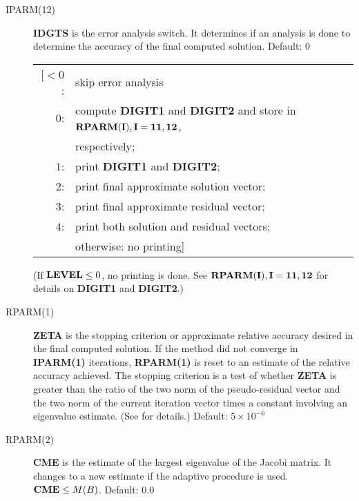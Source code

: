 \begin{description}
 \item[IPARM(12)] {\bf IDGTS} is the error analysis switch.  It determines
                  if an analysis is done to determine the accuracy of 
                  the final computed solution.  Default: $0$
 
                  \begin{tabular}{rl} 
                  [$<0$: & skip error analysis \\
                   $0$:  & compute {\bf DIGIT1} and {\bf DIGIT2} and 
                           store in ${\bf RPARM(I), I=11,12}$, \\ 
                         & respectively; \\
                   $1$:  & print {\bf DIGIT1} and {\bf DIGIT2}; \\
                   $2$:  & print final approximate solution vector; \\
                   $3$:  & print final approximate residual vector; \\
                   $4$:  & print both solution and residual vectors; \\
                         & otherwise:  no printing]
                  \end{tabular}

                  \noindent
                  (If ${\bf LEVEL} \leq 0$, no printing is done.  See 
                  ${\bf RPARM(I), I=11,12}$ for details on {\bf DIGIT1} 
                  and {\bf DIGIT2}.)
 
 \item[RPARM(1)] {\bf ZETA} is the stopping criterion or approximate 
                 relative accuracy desired in the final computed solution.
                 If the method did not converge in {\bf IPARM(1)} 
                 iterations, {\bf RPARM(1)} is reset to an estimate of 
                 the relative accuracy achieved.  The stopping criterion 
                 is a test of whether {\bf ZETA} is greater than the 
                 ratio of the two norm of the pseudo-residual vector and 
                 the two norm of the current iteration vector times a 
                 constant involving an eigenvalue estimate.  (See \cite{4,6} 
                 for details.) Default: $5 \times 10^{-6}$
 
 \item[RPARM(2)] {\bf CME} is the estimate of the largest eigenvalue of 
                 the Jacobi matrix.  It changes to a new estimate if the 
                 adaptive procedure is used.  ${\bf CME} \leq M(B)$.
                 Default: $0.0$
 

\end{description}
